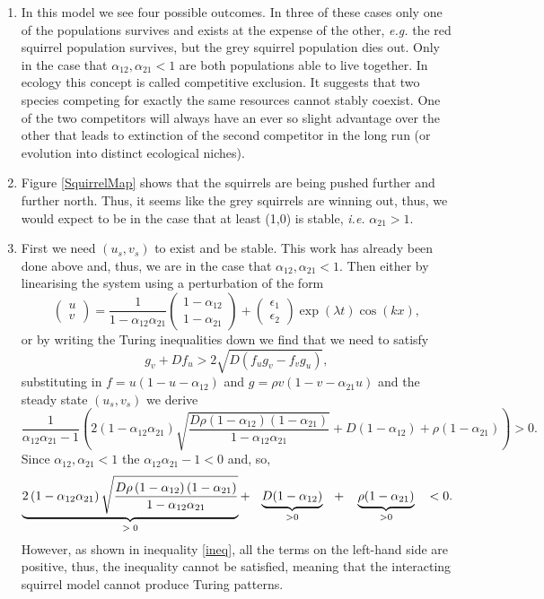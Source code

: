\documentclass[10pt]{article}
\newcommand{\bb}{\begin{equation}}
\newcommand{\ee}{\end{equation}}
\newcommand{\UB}[2]{\underbrace{#1}_{\textrm{\parbox{8em}{\centering #2}}}}
\newcommand{\fig}[1]{Figure \ref{#1}}
\newcommand{\eg}{\emph{e.g.} }
\newcommand{\ie}{\emph{i.e.} }
\renewcommand{\l}{\left(}
\renewcommand{\r}{\right)}
\begin{document}
\begin{Answ}
\begin{enumerate}
\item In this model we see four possible outcomes. In three of these cases only one of the populations survives and exists at the expense of the other, \eg the red squirrel population survives, but the grey squirrel population dies out. Only in the case that $\alpha_{12},\alpha_{21}<1$ are both populations able to live together. In ecology this concept is called competitive exclusion. It suggests that two species competing for exactly the same resources cannot stably coexist. One of the two competitors will always have an ever so slight advantage over the other that leads to extinction of the second competitor in the long run (or evolution into distinct ecological niches).

\item \fig{SquirrelMap} shows that the squirrels are being pushed further and further north. Thus, it seems like the grey squirrels are winning out, thus, we would expect to be in the case that at least (1,0) is stable, \ie $\alpha_{21}>1$.

\item First we need $(u_s,v_s)$ to exist and be stable. This work has already been done above and, thus, we are in the case that $\alpha_{12},\alpha_{21}<1$. Then either by linearising the system using a perturbation of the form
\bb
\l \begin {array}{c} u\\ v
\end {array} \r
=
\frac{1}{1-\alpha_{12}\alpha_{21}}\l \begin {array}{c} 1-\alpha_{12}\\ 1-\alpha_{21}
\end {array} \r
+
\l \begin {array}{c} \epsilon_1\\ \epsilon_2
\end {array} \r
\exp(\lambda t)\cos(kx),
\ee
or by writing the Turing inequalities down we find that we need to satisfy
\bb
g_v+Df_u>2\sqrt{D(f_ug_v-f_vg_u)},
\ee
substituting in $f=u(1-u-\alpha_{12})$ and $g=\rho v(1-v-\alpha_{21}u)$ and the steady state $(u_s,v_s)$ we derive
\bb
\frac {1}{\alpha_{12}\alpha_{21}-1} \l  2\l 1 -\alpha_{12}\alpha_{21} \r \sqrt{{\frac{D\rho \l 1-\alpha_{12}\r \l 1-\alpha_{21} \r }{1-\alpha_{12}\alpha_{21}}}}+D(1-\alpha_{12})+\rho(1-\alpha_{21}) \r >0.
\ee
Since $\alpha_{12},\alpha_{21}<1$ the $\alpha_{12}\alpha_{21}-1<0$ and, so,
\bb
  \UB{2\l 1 -\alpha_{12}\alpha_{21} \r \sqrt{{\frac{D\rho \l 1-\alpha_{12}\r \l 1-\alpha_{21} \r }{1-\alpha_{12}\alpha_{21}}}}}{$>0$}+\UB{D(1-\alpha_{12})}{>0}+\UB{\rho(1-\alpha_{21})}{>0} <0.\label{ineq}
\ee
However, as shown in inequality \eqref{ineq}, all the terms on the left-hand side are positive, thus, the inequality cannot be satisfied, meaning that the interacting squirrel model cannot produce Turing patterns.


\end{enumerate}
\end{Answ}
\end{document}
